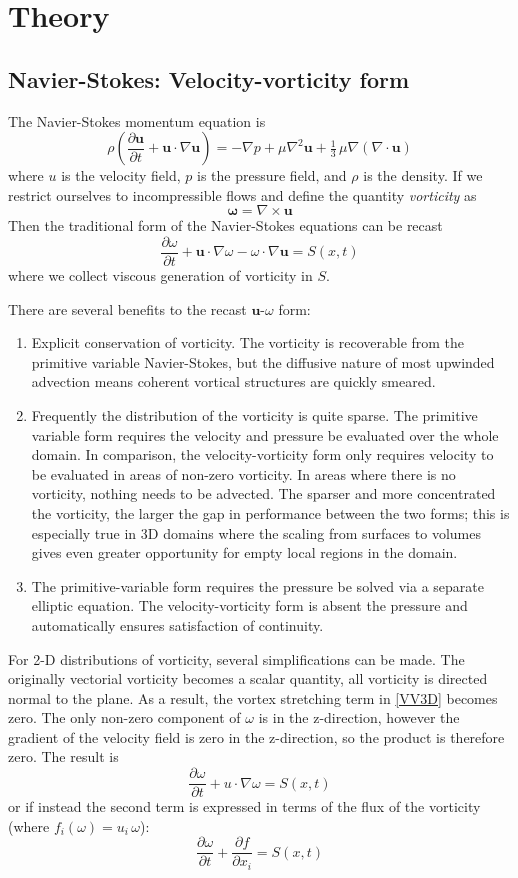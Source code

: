 \documentclass[letterpaper,12pt]{report}
\newcommand{\be}{\begin{equation}}
\newcommand{\ben}[1]{\begin{equation}\label{#1}}
\newcommand{\ee}{\end{equation}}
\begin{document}
\chapter{Theory}
\section{Navier-Stokes: Velocity-vorticity form}
The Navier-Stokes momentum equation is
 \be \rho \left(\frac{\partial \mathbf{u}}{\partial t} + \mathbf{u} \cdot \nabla \mathbf{u} \right) = -\nabla p + \mu \nabla^2 \mathbf u + \tfrac13 \, \mu \nabla (\nabla\cdot\mathbf{u}) \ee
where $u$ is the velocity field, $p$ is the pressure field, and $\rho$ is the density. If we restrict ourselves to incompressible flows and define the quantity \textit{vorticity} as
\be \mathbf{\omega} = \nabla \times \mathbf{u} \ee
Then the traditional form of the Navier-Stokes equations can be recast
\ben{VV3D} \frac{\partial \omega}{\partial t} +  \mathbf{u} \cdot \nabla \omega - \omega \cdot \nabla  \mathbf{u} = S(x,t)\ee
where we collect viscous generation of vorticity in $S$.

There are several benefits to the recast $\mathbf{u}$-$\omega$ form:
\begin{enumerate}
\item Explicit conservation of vorticity. The vorticity is recoverable from the primitive variable Navier-Stokes, but the diffusive nature of most upwinded advection means coherent vortical structures are quickly smeared.
\item Frequently the distribution of the vorticity is quite sparse. The primitive variable form requires the velocity and pressure be evaluated over the whole domain. In comparison, the velocity-vorticity form only requires velocity to be evaluated in areas of non-zero vorticity. In areas where there is no vorticity, nothing needs to be advected. The sparser and more concentrated the vorticity, the larger the gap in performance between the two forms; this is especially true in 3D domains where the scaling from surfaces to volumes gives even greater opportunity for empty local regions in the domain. 
\item The primitive-variable form requires the pressure be  solved via a separate elliptic equation. The velocity-vorticity form is absent the pressure and automatically ensures satisfaction of continuity.
\end{enumerate}

For 2-D distributions of vorticity, several simplifications can be made. The originally vectorial vorticity becomes a scalar quantity, all vorticity is directed normal to the plane. As a result, the vortex stretching term in \eqref{VV3D} becomes zero. The only non-zero component of $\omega$ is in the z-direction, however the gradient of the velocity field is zero in the z-direction, so the product is therefore zero. The result is
\ben{VV2D} \frac{\partial \omega}{\partial t} + u \cdot \nabla \omega = S(x,t)\ee
or if instead the second term is expressed in terms of the flux of the vorticity (where $f_i(\omega)=u_i\,\omega$):
\ben{VV2DB} \frac{\partial \omega}{\partial t} + \frac{\partial f}{\partial x_i}= S(x,t)\ee
\end{document}
